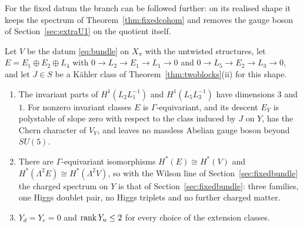 For the fixed datum the branch can be followed further: on its realised
shape it keeps the spectrum of Theorem~\ref{thm:fixedcohom} and removes
the gauge boson of Section~\ref{sec:extraU1} on the quotient itself.

\begin{theorem}\label{thm:fixedbranch}
Let $V$ be the datum \eqref{eq:bundle} on $X_\pi$ with the untwisted
structures, let $E=E_1\oplus E_2\oplus L_4$ with
$0\to L_2\to E_1\to L_1\to0$ and $0\to L_5\to E_2\to L_3\to0$, and let
$J\in S$ be a K\"ahler class of Theorem~\ref{thm:twoblocks}(ii) for this
shape.
\begin{enumerate}[label=\textup{(\roman*)},leftmargin=*,itemsep=1pt]
\item The invariant parts of $H^1(L_2L_1^{-1})$ and $H^1(L_5L_3^{-1})$ have
dimensions $3$ and $1$. For nonzero invariant classes $E$ is
$\Gamma$-equivariant, and its descent $E_Y$ is polystable of slope zero
with respect to the class induced by $J$ on $Y$, has the Chern character
of $V_Y$, and leaves no massless Abelian gauge boson beyond $SU(5)$.
\item There are $\Gamma$-equivariant isomorphisms $H^\ast(E)\cong
H^\ast(V)$ and $H^\ast(\Lambda^2E)\cong H^\ast(\Lambda^2V)$, so with the
Wilson line of Section~\ref{sec:fixedbundle} the charged spectrum on $Y$ is
that of Section~\ref{sec:fixedbundle}: three families, one Higgs doublet
pair, no Higgs triplets and no further charged matter.
\item $Y_d=Y_e=0$ and $\operatorname{rank} Y_u\le2$ for every choice of the extension classes.
\end{enumerate}
\end{theorem}
